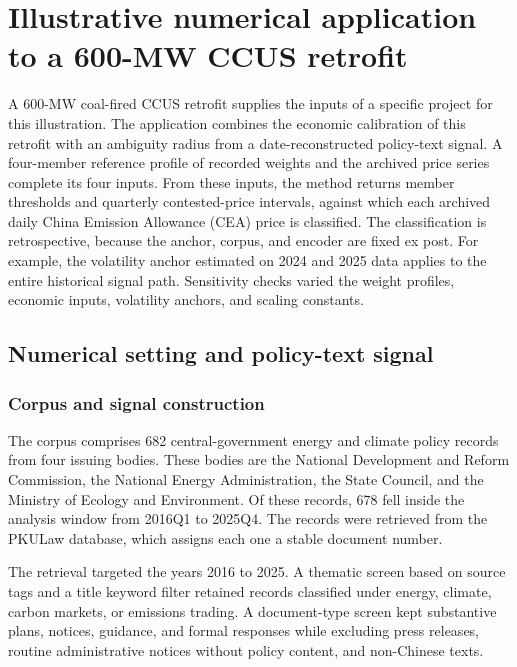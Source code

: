 \section{Illustrative numerical application to a 600-MW CCUS retrofit}

A 600-MW coal-fired CCUS retrofit supplies the inputs of a specific project for this illustration. The application combines the economic calibration of this retrofit with an ambiguity radius from a date-reconstructed policy-text signal. A four-member reference profile of recorded weights and the archived price series complete its four inputs. From these inputs, the method returns member thresholds and quarterly contested-price intervals, against which each archived daily China Emission Allowance (CEA) price is classified. The classification is retrospective, because the anchor, corpus, and encoder are fixed ex post. For example, the volatility anchor estimated on 2024 and 2025 data applies to the entire historical signal path. Sensitivity checks varied the weight profiles, economic inputs, volatility anchors, and scaling constants.

\subsection{Numerical setting and policy-text signal}

\subsubsection{Corpus and signal construction}

The corpus comprises 682 central-government energy and climate policy records from four issuing bodies. These bodies are the National Development and Reform Commission, the National Energy Administration, the State Council, and the Ministry of Ecology and Environment. Of these records, 678 fell inside the analysis window from 2016Q1 to 2025Q4. The records were retrieved from the PKULaw database, which assigns each one a stable document number.

The retrieval targeted the years 2016 to 2025. A thematic screen based on source tags and a title keyword filter retained records classified under energy, climate, carbon markets, or emissions trading. A document-type screen kept substantive plans, notices, guidance, and formal responses while excluding press releases, routine administrative notices without policy content, and non-Chinese texts.

